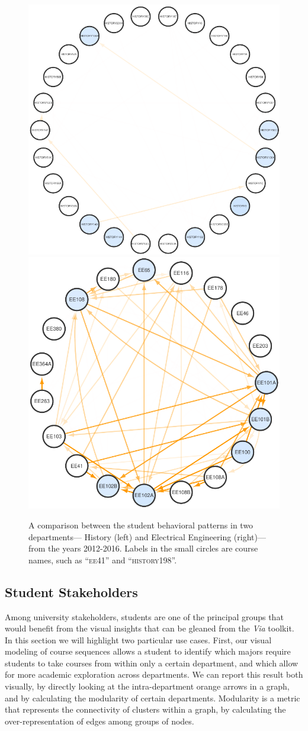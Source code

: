 \documentclass{sigchi}
\begin{document}
\begin{figure}
    \centering
    \includegraphics[width=0.55\columnwidth]{final-modularity-history.pdf}
    \includegraphics[width=0.44\columnwidth]{final-modularity-ee.pdf}
    \caption{A comparison between the student behavioral patterns in two departments--- History (left) and Electrical Engineering (right)---from the years 2012-2016. Labels in the small circles are course names, such as ``\textsc{ee41}'' and ``\textsc{history198}''.}
    \label{fig:modularity}
\end{figure}

\subsection{Student Stakeholders}
\label{sec:student_stakeholders}
Among university stakeholders, students are one of the principal
groups that would benefit from the visual insights that can be gleaned
from the \textit{Via} toolkit. In this section we will highlight two
particular use cases. First, our visual modeling of course sequences allows a student to identify which majors require students to take courses from within only a certain department, and which allow for more academic exploration across departments. We can report this result both visually, by directly looking at the intra-department orange arrows in a graph, and by calculating the modularity of certain departments. Modularity is a metric that represents the connectivity of clusters within a graph, by calculating the over-representation of edges among groups of nodes.
\end{document}

